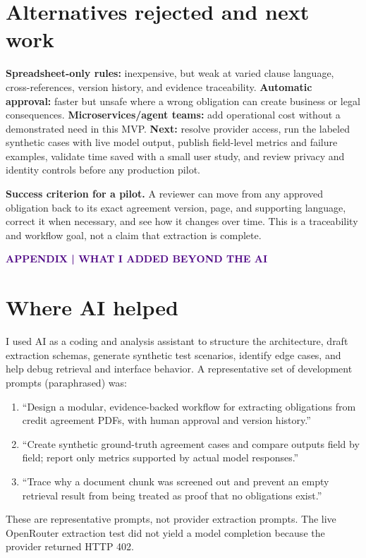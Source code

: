 \documentclass[10pt]{article}
\newcommand{\eyebrow}[1]{\textcolor{indigo}{\small\bfseries\MakeUppercase{#1}}}
\newcommand{\callout}[1]{\noindent\colorbox{pale}{\parbox{\dimexpr\linewidth-2\fboxsep}{#1}}}
\begin{document}
\section{Alternatives rejected and next work}
\textbf{Spreadsheet-only rules:} inexpensive, but weak at varied clause language, cross-references, version history, and evidence traceability. \textbf{Automatic approval:} faster but unsafe where a wrong obligation can create business or legal consequences. \textbf{Microservices/agent teams:} add operational cost without a demonstrated need in this MVP. \textbf{Next:} resolve provider access, run the labeled synthetic cases with live model output, publish field-level metrics and failure examples, validate time saved with a small user study, and review privacy and identity controls before any production pilot.

\vfill
\callout{\textbf{Success criterion for a pilot.} A reviewer can move from any approved obligation back to its exact agreement version, page, and supporting language, correct it when necessary, and see how it changes over time. This is a traceability and workflow goal, not a claim that extraction is complete.}

\newpage
\eyebrow{Appendix | What I added beyond the AI}
\section{Where AI helped}
I used AI as a coding and analysis assistant to structure the architecture, draft extraction schemas, generate synthetic test scenarios, identify edge cases, and help debug retrieval and interface behavior. A representative set of development prompts (paraphrased) was:
\begin{enumerate}
  \item ``Design a modular, evidence-backed workflow for extracting obligations from credit agreement PDFs, with human approval and version history.''
  \item ``Create synthetic ground-truth agreement cases and compare outputs field by field; report only metrics supported by actual model responses.''
  \item ``Trace why a document chunk was screened out and prevent an empty retrieval result from being treated as proof that no obligations exist.''
\end{enumerate}
These are representative prompts, not provider extraction prompts. The live OpenRouter extraction test did not yield a model completion because the provider returned HTTP 402.
\end{document}
